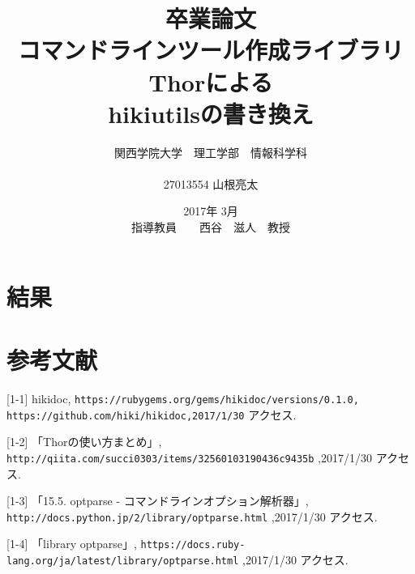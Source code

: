 \documentclass[12pt,a4paper]{jsarticle}
\begin{document}
\title{卒業論文\\
\vspace{4cm} コマンドラインツール作成ライブラリThorによる\\hikiutilsの書き換え}
\author{ 関西学院大学　理工学部　情報科学科\\\\27013554 山根亮太}
\date{\vspace{3cm} 2017年  3月\\
\vspace{3cm} 指導教員　　西谷　滋人　教授}
\maketitle
\setcounter{tocdepth}{4}
\tableofcontents

\tableofcontents




\section{結果}



\section{参考文献}
[1-1] hikidoc, \verb|https://rubygems.org/gems/hikidoc/versions/0.1.0,| \verb|https://github.com/hiki/hikidoc,2017/1/30| アクセス.

[1-2] 「Thorの使い方まとめ」, \verb|http://qiita.com/succi0303/items/32560103190436c9435b| ,2017/1/30 アクセス.

[1-3] 「15.5. optparse - コマンドラインオプション解析器」, \verb|http://docs.python.jp/2/library/optparse.html| ,2017/1/30 アクセス.

[1-4] 「library optparse」, \verb|https://docs.ruby-lang.org/ja/latest/library/optparse.html| ,2017/1/30 アクセス.
\end{document}
